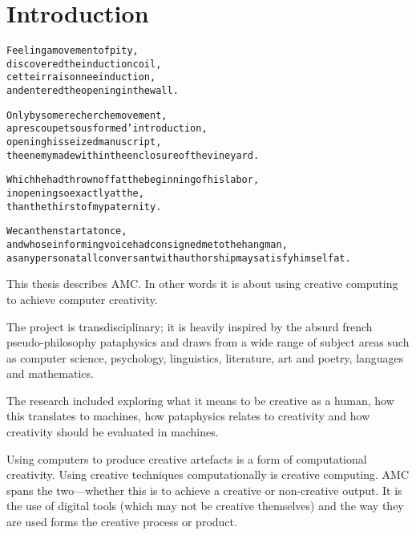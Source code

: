 
\chapter{Introduction}
\label{ch:introduction}

\startcontents[chapters]

\vfill

\begin{alltt}\sffamily
Feeling a movement of pity,
discovered the induction coil,
cette irraisonnee induction,
and entered the opening in the wall.

Only by some recherche movement,
apres coup et sous forme d'introduction,
opening his seized manuscript,
the enemy made within the enclosure of the vineyard.

Which he had thrown off at the beginning of his labor,
in opening so exactly at the,
than the thirst of my paternity.

We can then start at once,
and whose informing voice had consigned me to the hangman,
as any person at all conversant with authorship may satisfy himself at.
\end{alltt}

\newpage
\minicontents
\spirals

This thesis describes \acl{AMC}. In other words it is about using creative computing to achieve computer creativity.

The project is transdisciplinary; it is heavily inspired by the absurd french pseudo-philosophy pataphysics and draws from a wide range of subject areas such as computer science, psychology, linguistics, literature, art and poetry, languages and mathematics.

The research included exploring what it means to be creative as a human, how this translates to machines, how pataphysics relates to creativity and how creativity should be evaluated in machines.

Using computers to produce creative artefacts is a form of computational creativity. Using creative techniques computationally is creative computing. \ac{AMC} spans the two---whether this is to achieve a creative or non-creative output. It is the use of digital tools (which may not be creative themselves) and the way they are used forms the creative process or product. 

